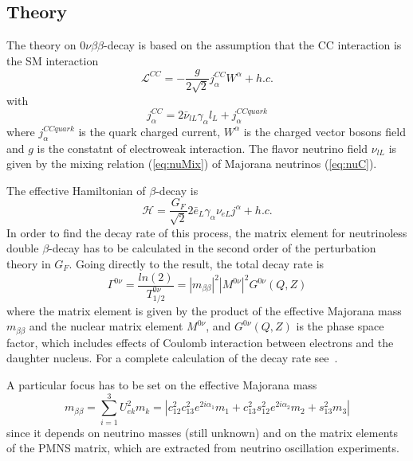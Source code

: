 \documentclass{subnucbo}
\begin{document}
\subsection{Theory}
The theory on $0\nu\beta\beta$-decay is based on the assumption that the CC interaction is the SM interaction
\begin{equation}
\mathcal{L}^{CC}=-\frac{g}{2\sqrt{2}}j_{\alpha}^{CC}W^{\alpha}+h.c.
\end{equation}
with
\begin{equation}
j_{\alpha}^{CC}=2\bar{\nu}_{lL}\gamma_{\alpha}l_L+j_{\alpha}^{CCquark}
\end{equation}
where $j_{\alpha}^{CCquark}$ is the quark charged current, $W^{\alpha}$ is the charged vector bosons field and $g$ is the constatnt of electroweak interaction. The flavor neutrino field $\nu_{lL}$ is given by the mixing relation (\ref{eq:nuMix}) of Majorana neutrinos (\ref{eq:nuC}).

The effective Hamiltonian of $\beta$-decay is 
\begin{equation}
\mathcal{H}=\frac{G_F}{\sqrt{2}}2\bar{e}_L\gamma_{\alpha}\nu_{eL}j^{\alpha}+h.c.
\end{equation}
In order to find the decay rate of this process, the matrix element for neutrinoless double $\beta$-decay has to be calculated in the second order of the perturbation theory in $G_F$. Going directly to the result, the total decay rate is
\begin{equation}
\Gamma^{0\nu}=\frac{ln(2)}{T^{0\nu}_{1/2}}=|m_{\beta\beta}|^2|M^{0\nu}|^2G^{0\nu}(Q,Z)
\end{equation}
where the matrix element is given by the product of the effective Majorana mass $m_{\beta\beta}$ and the nuclear matrix element $M^{0\nu}$, and $G^{0\nu}(Q,Z)$ is the phase space factor, which includes effects of Coulomb interaction between electrons and the daughter nucleus. For a complete calculation of the decay rate see~\cite{ref:Bil}.

A particular focus has to be set on the effective Majorana mass
\begin{equation}
\label{eq:BBmass}
m_{\beta\beta}=\sum_{i=1}^3U_{ek}^2m_k=|c_{12}^2c_{13}^2e^{2i\alpha_1}m_1+c_{13}^2s_{12}^2e^{2i\alpha_2}m_2+s_{13}^2m_3|
\end{equation}
since it depends on neutrino masses (still unknown) and on the matrix elements of the PMNS matrix, which are extracted from neutrino oscillation experiments.
\end{document}
